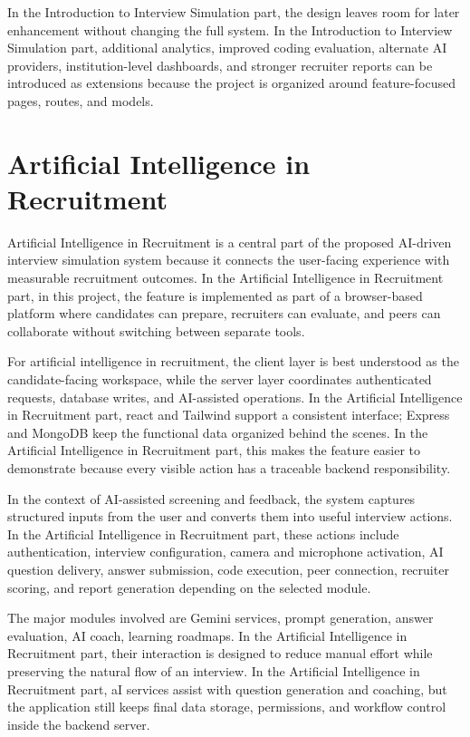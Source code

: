 \documentclass[12pt,a4paper]{report}
\begin{document}
In the Introduction to Interview Simulation part, the design leaves room for later enhancement without changing the full system. In the Introduction to Interview Simulation part, additional analytics, improved coding evaluation, alternate AI providers, institution-level dashboards, and stronger recruiter reports can be introduced as extensions because the project is organized around feature-focused pages, routes, and models.


\section{Artificial Intelligence in Recruitment}

Artificial Intelligence in Recruitment is a central part of the proposed AI-driven interview simulation system because it connects the user-facing experience with measurable recruitment outcomes. In the Artificial Intelligence in Recruitment part, in this project, the feature is implemented as part of a browser-based platform where candidates can prepare, recruiters can evaluate, and peers can collaborate without switching between separate tools.


For artificial intelligence in recruitment, the client layer is best understood as the candidate-facing workspace, while the server layer coordinates authenticated requests, database writes, and AI-assisted operations. In the Artificial Intelligence in Recruitment part, react and Tailwind support a consistent interface; Express and MongoDB keep the functional data organized behind the scenes. In the Artificial Intelligence in Recruitment part, this makes the feature easier to demonstrate because every visible action has a traceable backend responsibility.


In the context of AI-assisted screening and feedback, the system captures structured inputs from the user and converts them into useful interview actions. In the Artificial Intelligence in Recruitment part, these actions include authentication, interview configuration, camera and microphone activation, AI question delivery, answer submission, code execution, peer connection, recruiter scoring, and report generation depending on the selected module.


The major modules involved are Gemini services, prompt generation, answer evaluation, AI coach, learning roadmaps. In the Artificial Intelligence in Recruitment part, their interaction is designed to reduce manual effort while preserving the natural flow of an interview. In the Artificial Intelligence in Recruitment part, aI services assist with question generation and coaching, but the application still keeps final data storage, permissions, and workflow control inside the backend server.
\end{document}

